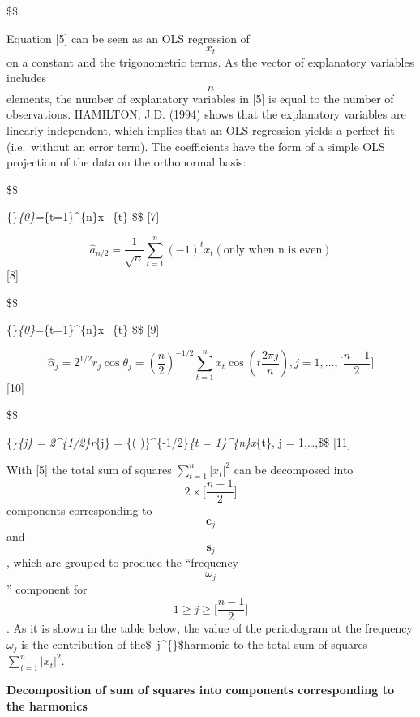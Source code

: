 \documentclass[
  letterpaper,
  DIV=11,
  numbers=noendperiod]{scrreprt}
\begin{document}
\$\$.

Equation {[}5{]} can be seen as an OLS regression of \[x_{t}\] on a
constant and the trigonometric terms. As the vector of explanatory
variables includes \[n\] elements, the number of explanatory variables
in {[}5{]} is equal to the number of observations. HAMILTON, J.D. (1994)
shows that the explanatory variables are linearly independent, which
implies that an OLS regression yields a perfect fit (i.e.~without an
error term). The coefficients have the form of a simple OLS projection
of the data on the orthonormal basis:

\$\$

\{\}\emph{\{0\}=\sum}\{t=1\}\^{}\{n\}x\_\{t\}
\$\$ {[}7{]}

\[
  {\widehat{a}}_{n/2}=\frac{1}{\sqrt{n}}\sum_{t=1}^{n}{(-1)}^{t}x_{t}\left(   \text{only when n is even} \right)
  \] {[}8{]}

\$\$

\{\}\emph{\{0\}=\sum}\{t=1\}\^{}\{n\}x\_\{t\}
\$\$ {[}9{]}

\[
  {\widehat{\alpha}}_{j} = 2^{1/2}r_{j}\cos{\theta_{j}} = {\left(\frac{n}{2} \right)}^{- 1/2}\sum_{t = 1}^{n}x_{t}\cos{\left(t\frac{2\pi j}{n}\right)}, j   = 1,\ldots,\lbrack\frac{n - 1}{2}\rbrack
  \] {[}10{]}

\$\$

\{\widehat{\beta}\}\emph{\{j\} = 2\^{}\{1/2\}r}\{j\} =
\{\left(  \right)\}\^{}\{-1/2\}\sum\emph{\{t =
1\}\^{}\{n\}x}\{t\}, j =
1,\ldots,\lbrack{}\rbrack \$\$ {[}11{]}

With {[}5{]} the total sum of squares
\(\sum_{t = 1}^{n}\left| x_{t} \right|^{2}\) can be decomposed into
\[2 \times \lbrack\frac{n - 1}{2}\rbrack\] components corresponding to
\[\mathbf{c}_{j}\] and \[\mathbf{s}_{j}\], which are grouped to produce
the ``frequency \[ω_{j}\]'' component for
\[1 \geq j \geq \lbrack\frac{n - 1}{2}\rbrack\]. As it is shown in the
table below, the value of the periodogram at the frequency
\(\omega_{j}\) is the contribution of the\$~j\^{}\{\}\$harmonic
to the total sum of squares
\(\sum_{t = 1}^{n}\left| x_{t} \right|^{2}\).

\textbf{Decomposition of sum of squares into components corresponding to
the harmonics}
\end{document}
